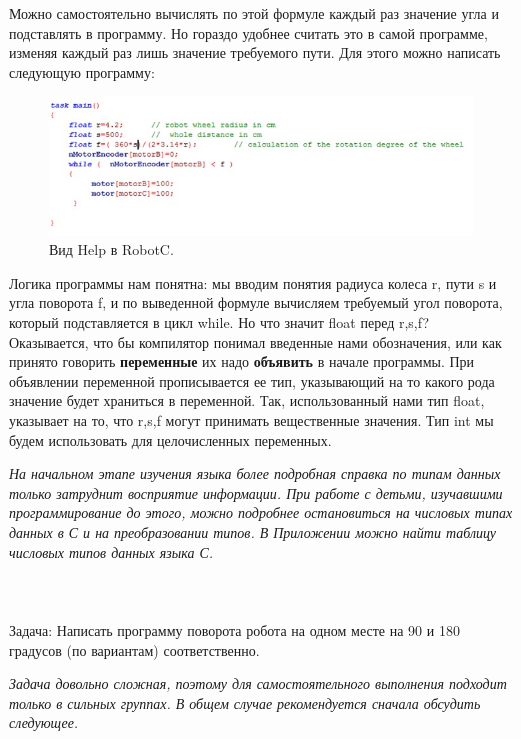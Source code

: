 Можно самостоятельно вычислять по этой формуле каждый раз значение угла и подставлять в программу. Но гораздо удобнее считать это в самой программе, изменяя каждый раз лишь значение требуемого пути. Для этого можно написать следующую программу:
\clearpage
\begin{figure}[h!]
	\begin{center}
		\includegraphics[width=1\linewidth]{chapters/chapter11/images/2}
		\caption{Вид Help в RobotC.}
		\label{ris:image11x2}
	\end{center}
\end{figure}

Логика программы нам понятна: мы вводим понятия радиуса колеса r, пути s и угла поворота f, и по выведенной формуле вычисляем требуемый угол поворота, который подставляется в цикл while. Но что значит float перед r,s,f?  Оказывается, что бы компилятор понимал введенные нами обозначения, или как принято говорить {\bfseries переменные} их надо {\bfseries объявить} в начале программы. При объявлении переменной прописывается ее тип, указывающий на то какого  рода значение будет храниться в переменной. Так, использованный нами тип float, указывает на то, что r,s,f могут принимать вещественные значения. Тип int мы будем использовать для целочисленных переменных.

{\slshape На начальном этапе изучения языка более подробная справка по типам данных только затруднит восприятие информации. При работе с детьми, изучавшими программирование до этого, можно подробнее остановиться на числовых типах данных в С и на преобразовании типов. В Приложении можно найти таблицу числовых типов данных языка С.}\\\\

{\hypertarget{lesson11x4}{}}\\\\

Задача: Написать программу поворота робота на одном месте на 90 и 180 градусов (по вариантам) соответственно.

{\slshape Задача довольно сложная, поэтому для самостоятельного выполнения подходит только в сильных группах. В общем случае рекомендуется сначала обсудить следующее.}

